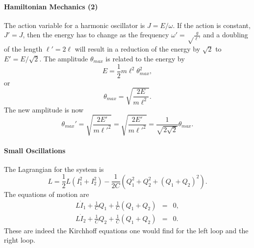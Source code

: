 \documentclass[letterpaper,11pt]{article}
\begin{document}
\paragraph*{Hamiltonian Mechanics (2)}
The action variable for a harmonic oscillator is $J = E/\omega$.  If the action is constant, $J' = J$, then the energy has to change as the frequency $\omega' = \sqrt\frac{g}{\ell'}$ and a doubling of the length $\ell' = 2 \ell$ will result in a reduction of the energy by $\sqrt{2}$ to $E' = E / \sqrt{2}$.  The amplitude $\theta_{max}$ is related to the energy by
\begin{equation*}
 E = \frac{1}{2} m\ell^2\theta_{max}^2,
\end{equation*}
or
\begin{equation*}
 \theta_{max} = \sqrt{\frac{2 E}{m\ell^2}}.
\end{equation*}
The new amplitude is now
\begin{equation*}
 \theta_{max}' = \sqrt{\frac{2 E'}{m\ell'^2}} = \sqrt{\frac{2 E'}{m\ell'^2}} = \frac{1}{\sqrt{2\sqrt{2}}} \theta_{max}.
\end{equation*}

\paragraph*{Small Oscillations}
The Lagrangian for the system is
\begin{equation*}
 L = \frac{1}{2} L (I_1^2 + I_2^2) - \frac{1}{2 C} \left(Q_1^2 + Q_2^2 + (Q_1 + Q_2)^2\right).
\end{equation*}
The equations of motion are
\begin{eqnarray*}
 L \dot{I}_1 + \frac{1}{C} Q_1 + \frac{1}{C} (Q_1 + Q_2) & = & 0, \\
 L \dot{I}_2 + \frac{1}{C} Q_2 + \frac{1}{C} (Q_1 + Q_2) & = & 0.
\end{eqnarray*}
These are indeed the Kirchhoff equations one would find for the left loop and the right loop.
\end{document}
